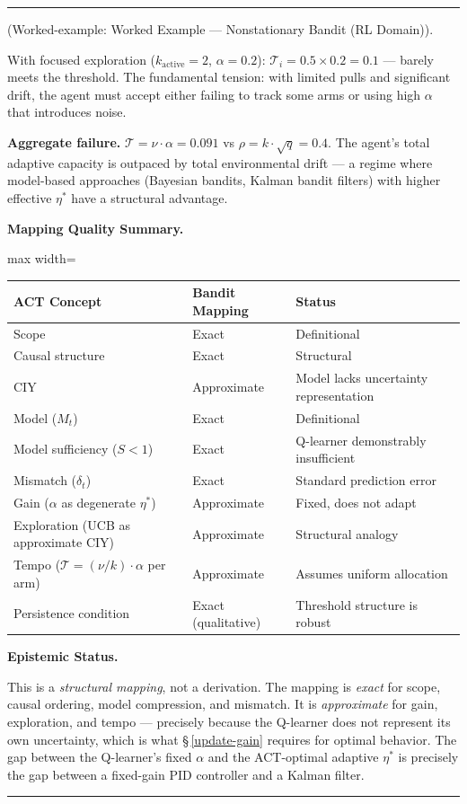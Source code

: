 \documentclass[11pt,oneside]{article}
\newcounter{claim}[section]
\renewcommand{\theclaim}{\thesection.\arabic{claim}}
\newenvironment{segment}[2]{%
  \refstepcounter{claim}%
  \bigskip\noindent\hrule\smallskip
  \noindent{\bfseries #1~\theclaim}\enskip(#2).\par\smallskip
  \noindent\ignorespaces
}{%
  \par\smallskip\noindent\hrule\bigskip
}
\newenvironment{remark}[1][]{\begin{segment}{Remark}{#1}}{\end{segment}}
\begin{document}
\begin{remark}[Worked-example: Worked Example — Nonstationary Bandit (RL Domain)]
With focused exploration ($k_{\text{active}} = 2$, $\alpha = 0.2$): $\mathcal T_i = 0.5 \times 0.2 = 0.1$ — barely meets the threshold. The fundamental tension: with limited pulls and significant drift, the agent must accept either failing to track some arms or using high $\alpha$ that introduces noise.

\textbf{Aggregate failure.} $\mathcal{T} = \nu \cdot \alpha = 0.091$ vs $\rho = k \cdot \sqrt{q} = 0.4$. The agent's total adaptive capacity is outpaced by total environmental drift — a regime where model-based approaches (Bayesian bandits, Kalman bandit filters) with higher effective $\eta^*$ have a structural advantage.


\medskip\noindent\textbf{Mapping Quality Summary.}


\begin{adjustbox}{max width=\textwidth}
\small
\begin{tabular}{lll}
\toprule
ACT Concept & Bandit Mapping & Status \\
\midrule
Scope & Exact & Definitional \\
Causal structure & Exact & Structural \\
CIY & Approximate & Model lacks uncertainty representation \\
Model ($M_t$) & Exact & Definitional \\
Model sufficiency ($S < 1$) & Exact & Q-learner demonstrably insufficient \\
Mismatch ($\delta_t$) & Exact & Standard prediction error \\
Gain ($\alpha$ as degenerate $\eta^*$) & Approximate & Fixed, does not adapt \\
Exploration (UCB as approximate CIY) & Approximate & Structural analogy \\
Tempo ($\mathcal{T} = (\nu/k) \cdot \alpha$ per arm) & Approximate & Assumes uniform allocation \\
Persistence condition & Exact (qualitative) & Threshold structure is robust \\
\bottomrule
\end{tabular}
\end{adjustbox}



\medskip\noindent\textbf{Epistemic Status.}


This is a \textit{structural mapping}, not a derivation. The mapping is \textit{exact} for scope, causal ordering, model compression, and mismatch. It is \textit{approximate} for gain, exploration, and tempo — precisely because the Q-learner does not represent its own uncertainty, which is what \S\,\ref{update-gain} requires for optimal behavior. The gap between the Q-learner's fixed $\alpha$ and the ACT-optimal adaptive $\eta^*$ is precisely the gap between a fixed-gain PID controller and a Kalman filter.


\end{remark}
\end{document}

